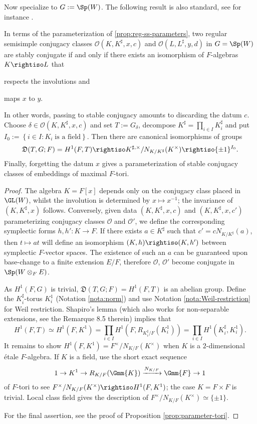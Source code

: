 \documentclass[a4paper,10pt]{article}
\begin{document}
Now specialize to $G := \Sp(W)$. The following result is also standard, see for instance \cite[\S 3]{Li11}.
\begin{proposition}\label{prop:D-description}
	In terms of the parameterization of \ref{prop:reg-ss-parameters}, two regular semisimple conjugacy classes $\mathcal{O}(K, K^\sharp, x, c)$ and $\mathcal{O}(L, L^\sharp, y, d)$ in $G = \Sp(W)$ are stably conjugate if and only if there exists an isomorphism of $F$-algebras $K \rightiso L$ that
	\begin{compactitem}
		\item respects the involutions and
		\item maps $x$ to $y$.
	\end{compactitem}
	In other words, passing to stable conjugacy amounts to discarding the datum $c$. Choose $\delta \in \mathcal{O}(K, K^\sharp, x, c)$ and set $T := G_\delta$, decompose $K^\sharp = \prod_{i \in I} K_i^\sharp$ and put $I_0 := \left\{ i \in I: K_i \;\text{is a field} \right\}$. Then there are canonical isomorphisms of groups
	\[ \mathfrak{D}(T, G; F) = H^1(F, T) \rightiso K^{\sharp, \times}/N_{K/K^\sharp}(K^\times) \rightiso \{\pm 1\}^{I_0}. \]
	Finally, forgetting the datum $x$ gives a parameterization of stable conjugacy classes of embeddings of maximal $F$-tori.
\end{proposition}
\begin{proof}
	The algebra $K = F[x]$ depends only on the conjugacy class placed in $\GL(W)$, whilst the involution is determined by $x \mapsto x^{-1}$; the invariance of $(K, K^\sharp, x)$ follows. Conversely, given data $(K, K^\sharp, x, c)$ and $(K, K^\sharp, x, c')$ parameterizing conjugacy classes $\mathcal{O}$ and $\mathcal{O}'$, we define the corresponding symplectic forms $h,h': K \to F$. If there exists $a \in K^\sharp$ such that $c' = cN_{K/K^\sharp}(a)$, then $t \mapsto at$ will define an isomorphism $(K, h) \rightiso (K, h')$ between symplectic $F$-vector spaces. The existence of such an $a$ can be guaranteed upon base-change to a finite extension $E/F$, therefore $\mathcal{O}$, $\mathcal{O}'$ become conjugate in $\Sp(W \otimes_F E)$.
	
	As $H^1(F, G)$ is trivial, $\mathfrak{D}(T, G; F) = H^1(F, T)$ is an abelian group. Define the $K_i^\sharp$-torus $K_i^1$ (Notation \ref{nota:norm}) and use Notation \ref{nota:Weil-restriction} for Weil restriction. Shapiro's lemma \cite[Exp XXIV. Proposition 8.4]{SGA3-3} (which also works for non-separable extensions, see the Remarque 8.5 therein) implies that
	\[ H^1(F,T) \simeq H^1(F, K^1) = \prod_{i \in I} H^1 \left( F, R_{K_i^\sharp/F}(K_i^1) \right) = \prod_{i \in I} H^1(K_i^\sharp, K_i^1). \]
	It remains to show $H^1(F, K^1) = F^\times / N_{K/F}(K^\times)$ when $K$ is a $2$-dimensional étale $F$-algebra. If $K$ is a field, use the short exact sequence
	\[ 1 \to K^1 \to R_{K/F}(\Gmm{K}) \xrightarrow{N_{K/F}} \Gmm{F} \to 1 \]
	of $F$-tori to see $F^\times/N_{K/F}(K^\times) \rightiso H^1(F, K^1)$; the case $K = F \times F$ is trivial. Local class field gives the description of $F^\times/N_{K/F}(K^\times) \simeq \{\pm 1\}$.

	For the final assertion, see the proof of Proposition \ref{prop:parameter-tori}. 
\end{proof}
\end{document}
